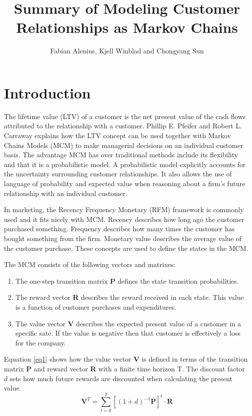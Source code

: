 \documentclass[11pt]{article}
\author{Fabian Alenius, Kjell Winblad and Chongyang Sun}
\title{Summary of Modeling Customer Relationships as Markov Chains}
\begin{document}
\maketitle


\section{Introduction}
The lifetime value (LTV) of a customer is the net present value of the cash flows attributed to the relationship with a customer.
Phillip E. Pfeifer and Robert L. Carraway \cite{customer} explains how the LTV concept can be used together with Markov Chains Models (MCM) to make managerial decisions on an individual customer basis.
The advantage MCM has over traditional methods include its flexibility and that it is a probabilistic model.
A probabilistic model explicitly accounts for the uncertainty surrounding customer relationships.
It also allows the use of language of probability and expected value when reasoning about a firm's future relationship with an individual customer.

In marketing, the Recency Frequency Monetary (RFM) framework is commonly used and it fits nicely with MCM.
Recency describes how long ago the customer purchased something.
Frequency describes how many times the customer has bought something from the firm.
Monetary value describes the average value of the customer purchase.
These concepts are used to define the states in the MCM.

The MCM consists of the following vectors and matrixes: 
\begin{enumerate}
\item The one-step transition matrix \textbf{P} defines the state transition probabilities.
\item The reward vector \textbf{R}  describes the reward received in each state. This value is a function of customer purchases and expenditures.
\item The value vector \textbf{V} describes  the expected present value of a customer in a specific sate. If the value is negative then that customer is effectively a loss for the company.
\end{enumerate}

Equation \ref{eq1} shows how the value vector \textbf{V} is defined in terms of the transition matrix  \textbf{P} and reward vector  \textbf{R} with a finite time horizon T.
The discount factor $d$ sets how much future rewards are discounted when calculating the present value.
\begin{equation}\label{eq1}
\textbf{V}^T = \sum_{t=0}^T  [(1 + d)^{-1} \textbf{P}]^t \cdot \textbf{R}
\end{equation}
\end{document}
